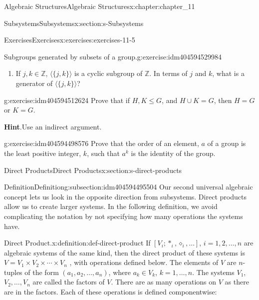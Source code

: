 \documentclass[twoside,10pt,]{book}
\newcommand{\blocktitlefont}{\relax}
\numberwithin{equation}{section}
\begin{document}
\begin{chapterptx}{Algebraic Structures}{}{Algebraic Structures}{}{}{x:chapter:chapter_11}
\begin{sectionptx}{Subsystems}{}{Subsystems}{}{}{x:section:s-Subsystems}
\begin{exercises-subsection}{Exercises}{}{Exercises}{}{}{x:exercises:exercises-11-5}
\begin{divisionexercise}{6}{Subgroups generated by subsets of a group.}{}{g:exercise:idm404594529984}
\begin{enumerate}[label=(\alph*)]
\item{}If \(j, k \in  \mathbb{Z}\), \(\langle\{j,k\}\rangle\) is a cyclic subgroup of \(\mathbb{Z}\). In terms of \(j\) and \(k\), what is a generator of \(\langle \{j, k\}\rangle \)?%
\end{enumerate}
%
\end{divisionexercise}%
\begin{divisionexercise}{7}{}{}{g:exercise:idm404594512624}%
Prove that if \(H,K \leq  G\), and \(H\cup K=G\), then \(H = G\) or \(K = G\).%
\par\smallskip%
\noindent\textbf{\blocktitlefont Hint}.\label{g:hint:idm404594507728}{}\hypertarget{g:hint:idm404594507728}{}\quad{}Use an indirect argument.%
\end{divisionexercise}%
\begin{divisionexercise}{8}{}{}{g:exercise:idm404594498576}%
Prove that the order of an element, \(a\) of a group is the least positive integer, \(k\), such that \(a^k\) is the identity of the group.%
\end{divisionexercise}%
\end{exercises-subsection}
\end{sectionptx}
%
%
\typeout{************************************************}
\typeout{************************************************}
%
\begin{sectionptx}{Direct Products}{}{Direct Products}{}{}{x:section:s-direct-products}
%
%
%
\typeout{************************************************}
\typeout{************************************************}
%
\begin{subsectionptx}{Definition}{}{Definition}{}{}{g:subsection:idm404594495504}
Our second universal algebraic concept lets us look in the opposite direction from subsystems. Direct products allow us to create larger systems. In the following definition, we avoid complicating the notation by not specifying how many operations the systems have.%
\begin{definition}{Direct Product.}{x:definition:def-direct-product}%
%
\label{g:notation:idm404594494080}%
If \(\left[V_i;*_i, \diamond_i, \ldots \right]\), \(i = 1, 2, \ldots, n\) are algebraic systems of the same kind,  then the direct product of these systems is \(V =V_1\times
V_2\times \cdots \times V_n\) , with operations defined below. The elements of \(V\) are \(n\)-tuples of the form \(\left(a_1, a_2, \dots , a _n \right)\), where \(a_k \in  V_k\), \(k = 1, \dots , n\). The systems \(V_1\), \(V_2,  \dots, V_n\) are called the factors of \(V\). There are as many operations on \(V\) as there are in the factors.  Each of these operations is defined componentwise:%

\end{definition}
\end{subsectionptx}
\end{sectionptx}
\end{chapterptx}
\end{document}
